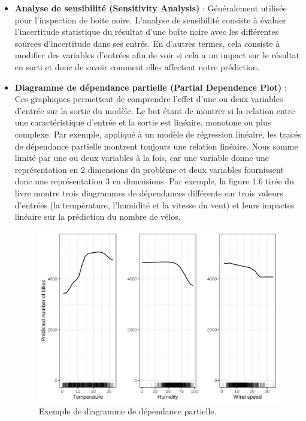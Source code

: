 \begin{itemize}
    \item \textbf{Analyse de sensibilité (Sensitivity Analysis)} : Généralement utilisée pour l'inspection de boite noire. L'analyse de sensibilité consiste à évaluer l’incertitude statistique du résultat d’une boîte noire avec les différentes sources d’incertitude dans ses entrés. En d'autres termes, cela consiste à modifier des variables d'entrées afin de voir si cela a un impact sur le résultat en sorti et donc de savoir comment elles affectent notre prédiction.
    
    \item \textbf{Diagramme de dépendance partielle (Partial Dependence Plot)} : Ces graphiques permettent de comprendre l'effet d'une ou deux variables d'entrée sur la sortie du modèle. Le but étant de  montrer si la relation entre une caractéristique d'entrée et la sortie est linéaire, monotone ou plus complexe. Par exemple, appliqué à un modèle de régression linéaire, les tracés de dépendance partielle montrent toujours une relation linéaire. Nous somme limité par une ou deux variables à la fois, car une variable donne une représentation en 2 dimensions du problème et deux variables fournissent donc une représentation 3 en dimensions. Par exemple, la figure 1.6 tirée du livre \cite{molnar2019} montre trois diagrammes de dépendances différents sur trois valeurs d'entrées (la température, l'humidité et la vitesse du vent) et leurs impactes linéaire sur la prédiction du nombre de vélos.
    \begin{figure}[h]
        \includegraphics[scale=0.17]{src_img/partialDependencePlot.png}
        \caption{Exemple de diagramme de dépendance partielle.}
        \label{partialDependencePlot}
    \end{figure}
    

\end{itemize}
